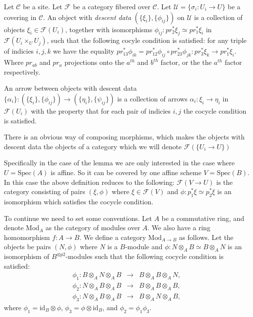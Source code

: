 \begin{definition}
\label{definition-category-descent-datum}
Let $\mathcal C$ be a site.  Let $\mathcal F$ be a category fibered over
$\mathcal C$.  Let $\mathcal U = \{\sigma_i : U_i \rightarrow U\}$ be a
covering in $\mathcal C$.  An object with {\it descent data}
$(\{\xi_i\}, \{\phi_{ij}\})$ on $\mathcal U$ is a collection of objects
$\xi_i \in \mathcal F(U_i)$, together with isomorphisms
$\phi_{ij}: pr_2^*\xi_j \simeq pr_1^*\xi_i$ in
$\mathcal F(U_i \times_U U_j)$, such that the following cocyle condition
is satisfied:  for any triple of indicies $i, j, k$ we have the equality
$pr_{13}^*\phi_{ik} = pr_{12}^*\phi_{ij} \circ pr_{23}^*\phi_{jk}: 
pr_3^*\xi_k \rightarrow pr_1^*\xi_i$.  Where $pr_{ab}$ and $pr_a$
projections onto the $a^{th}$ and $b^{th}$ factor, or the the $a^{th}$
factor respectively.

\medskip\noindent
An arrow between objects with descent data
$\{\alpha_i\}: (\{\xi_i\},\{\phi_{ij}\}) \rightarrow
(\{\eta_i\},\{\psi_{ij}\})$ is a collection of arrows
$\alpha_i : \xi_i \rightarrow \eta_i$ in $\mathcal F(U_i)$ with the property
that for each pair of indicies $i,j$ the cocycle condition is satisfied.

\medskip\noindent
There is an obvious way of composing morphisms, which makes the objects with
descent data the objects of a category which we will denote
$\mathcal F(\{U_i \rightarrow U\})$

\medskip\noindent
Specifically in the case of the lemma we are only interested in the case where
$U = \text{Spec}(A)$ is affine.  So it can be covered by one affine scheme
$V=\text{Spec}(B)$.  In this case the above definition reduces to the
following:  $\mathcal F(V \rightarrow U)$ is the category consisting of pairs
$(\xi, \phi)$ where $\xi \in \mathcal F(V)$ and
$\phi: p_1^*\xi  \simeq p_2^*\xi$ is an isomorphism which satisfies the
cocycle condition. 
\end{definition}

\noindent
To continue we need to set some conventions.  Let $A$ be a commutative ring,
and denote $\text{Mod}_A$ as the category of modules over $A$.  We also have a 
ring
homomorphism $f: A \rightarrow B$.  We define a category
$\text{Mod}_{A\rightarrow B}$ as follows.  Let the objects be pairs $(N,\phi)$
where $N$ is a $B$-module and $\phi:  N \otimes_A B \simeq B \otimes_A N$
is an isomorphism of $B^{\otimes p2}$-modules such that the following cocycle
condition is satisfied:  
\begin{eqnarray}
\phi_1: B \otimes_A N \otimes_A B & \rightarrow & B \otimes_A B \otimes_A N,
\nonumber\\
\phi_2: N \otimes_A B \otimes_A B & \rightarrow & B \otimes_A B \otimes_A B,
\nonumber\\
\phi_3: N \otimes_A B \otimes_A B & \rightarrow & B \otimes_A N \otimes_A B,
\nonumber
\end{eqnarray}
where $\phi_1 = \text{id}_B \otimes \phi$, $\phi_3 = \phi \otimes \text{id}_B$, 
and
$\phi_2 = \phi_1\phi_3$.

